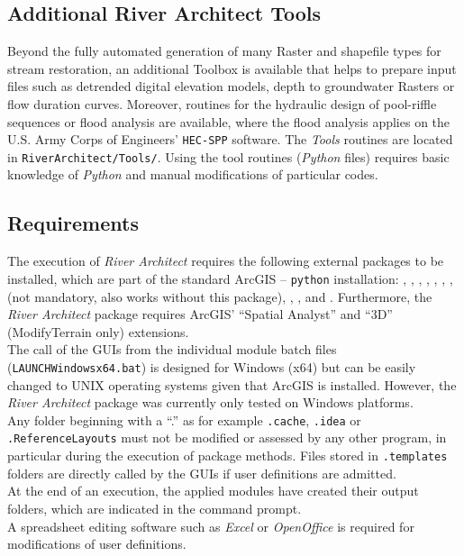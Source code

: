 \subsection{Additional River Architect Tools} \label{sec:tools}
Beyond the fully automated generation of many Raster and shapefile types for stream restoration, an additional Toolbox is available that helps to prepare input files such as detrended digital elevation models, depth to groundwater Rasters or flow duration curves. Moreover, routines for the hydraulic design of pool-riffle sequences or flood analysis are available, where the flood analysis applies on the U.S. Army Corps of Engineers' \texttt{HEC-SPP} software. The \textit{Tools} routines are located in \texttt{RiverArchitect/Tools/}. Using the tool routines (\textit{Python} files) requires basic knowledge of \textit{Python} and manual modifications of particular codes.

\subsection{Requirements}
The execution of \textit{River Architect} requires the following external packages to be installed, which are part of the standard ArcGIS -- \texttt{python} installation: , , , , , , ,  (not mandatory, also works without this package), , , and . Furthermore, the \textit{River Architect} package requires ArcGIS' ``Spatial Analyst'' and ``3D'' (ModifyTerrain only) extensions.\\
The call of the GUIs from the individual module batch files (\texttt{LAUNCH{\myUnderscore}Windows{\myUnderscore}x64.bat}) is designed for Windows (x64) but can be easily changed to UNIX operating systems given that ArcGIS is installed. However, the \textit{River Architect} package was currently only tested on Windows platforms.\\
Any folder beginning with a ``.'' as for example \texttt{.cache}, \texttt{.idea} or \texttt{.ReferenceLayouts} must not be modified or assessed by any other program, in particular during the execution of package methods. Files stored in \texttt{.templates} folders are directly called by the GUIs if user definitions are admitted.\\
At the end of an execution, the applied modules have created their output folders, which are indicated in the command prompt.\\
A spreadsheet editing software such as \textit{Excel} or \textit{OpenOffice} is required for modifications of user definitions.


